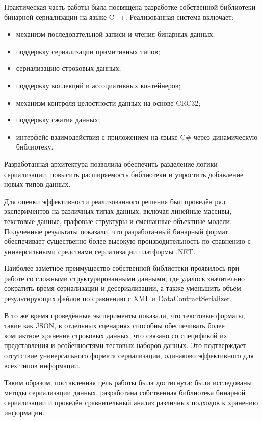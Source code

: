 \documentclass[coursework]{SCWorks}
\begin{document}
Практическая часть работы была посвящена разработке собственной библиотеки бинарной сериализации на языке C++. Реализованная система включает:
\begin{itemize}
    \item механизм последовательной записи и чтения бинарных данных;
    \item поддержку сериализации примитивных типов;
    \item сериализацию строковых данных;
    \item поддержку коллекций и ассоциативных контейнеров;
    \item механизм контроля целостности данных на основе CRC32;
    \item поддержку сжатия данных;
    \item интерфейс взаимодействия с приложением на языке C\# через динамическую библиотеку.
\end{itemize}

Разработанная архитектура позволила обеспечить разделение логики сериализации, повысить расширяемость библиотеки и упростить добавление новых типов данных.

Для оценки эффективности реализованного решения был проведён ряд экспериментов на различных типах данных, включая линейные массивы, текстовые данные, графовые структуры и смешанные объектные модели. Полученные результаты показали, что разработанный бинарный формат обеспечивает существенно более высокую производительность по сравнению с универсальными средствами сериализации платформы .NET.

Наиболее заметное преимущество собственной библиотеки проявилось при работе со сложными структурированными данными, где удалось значительно сократить время сериализации и десериализации, а также уменьшить объём результирующих файлов по сравнению с XML и DataContractSerializer.

В то же время проведённые эксперименты показали, что текстовые форматы, такие как JSON, в отдельных сценариях способны обеспечивать более компактное хранение строковых данных, что связано со спецификой их представления и особенностями тестовых наборов данных. Это подтверждает отсутствие универсального формата сериализации, одинаково эффективного для всех типов информации.

Таким образом, поставленная цель работы была достигнута: были исследованы методы сериализации данных, разработана собственная библиотека бинарной сериализации и проведён сравнительный анализ различных подходов к хранению информации.
\end{document}
